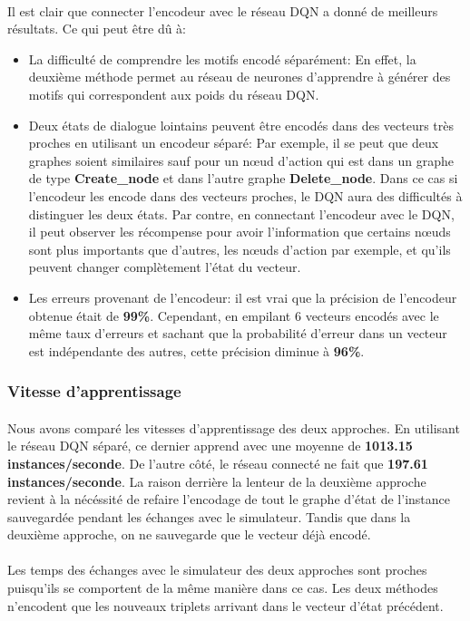 \paragraph{}Il est clair que connecter l'encodeur avec le réseau DQN a donné de meilleurs résultats. Ce qui peut être dû à:
\begin{itemize}
	\item La difficulté de comprendre les motifs encodé séparément: En effet, la deuxième méthode permet au réseau de neurones d'apprendre à générer des motifs qui correspondent aux poids du réseau DQN.
	\item Deux états de dialogue lointains peuvent être encodés dans des vecteurs très proches en utilisant un encodeur séparé: Par exemple, il se peut que deux graphes soient similaires sauf pour un n\oe{}ud d'action qui est dans un graphe de type \textbf{Create\_node} et dans l'autre graphe \textbf{Delete\_node}. Dans ce cas si l'encodeur les encode dans des vecteurs proches, le DQN aura des difficultés à distinguer les deux états. Par contre, en connectant l'encodeur avec le DQN, il peut observer les récompense pour avoir l'information que certains n\oe{}uds sont plus importants que d'autres, les n\oe{}uds d'action par exemple, et qu'ils peuvent changer complètement l'état du vecteur.
	\item Les erreurs provenant de l'encodeur: il est vrai que la précision de l'encodeur obtenue était de \textbf{99\%}. Cependant, en empilant 6 vecteurs encodés avec le même taux d'erreurs et sachant que la probabilité d'erreur dans un vecteur est indépendante des autres, cette précision diminue à \textbf{96\%}.
\end{itemize}
\subsubsection{Vitesse d'apprentissage}
\paragraph{}Nous avons comparé les vitesses d'apprentissage des deux approches. En utilisant le réseau DQN séparé, ce dernier apprend avec une moyenne de \textbf{1013.15 instances/seconde}. De l'autre côté, le réseau connecté ne fait que \textbf{197.61 instances/seconde}. La raison derrière la lenteur de la deuxième approche revient à la nécéssité de refaire l'encodage de tout le graphe d'état de l'instance sauvegardée pendant les échanges avec le simulateur. Tandis que dans la deuxième approche, on ne sauvegarde que le vecteur déjà encodé.\\\\
Les temps des échanges avec le simulateur des deux approches sont proches puisqu'ils se comportent de la même manière dans ce cas. Les deux méthodes n'encodent que les nouveaux triplets arrivant dans le vecteur d'état précédent. 
